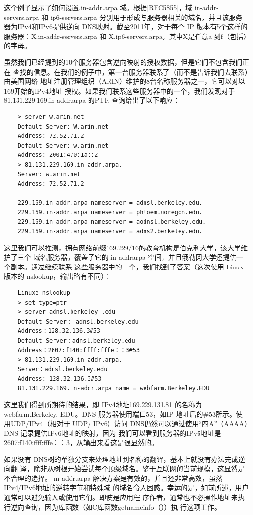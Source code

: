 这个例子显示了如何设置.in-addr.arpa 域。根据\href{https://www.rfc-editor.org/rfc/rfc5855}{[RFC5855]}，域 in-addr-servers.arpa 和
ip6-servers.arpa 分别用于形成与服务器相关的域名，并且该服务器为IPv4和IPv6提供逆向
DNS映射。截至2011年，对于每个 IP 版本有5个这样的服务器：X.in-addr-servers.arpa 和
X.ip6-servers.arpa，其中X是任意a 到f（包括）的字母。

虽然我们已经提到的10个服务器包含逆向映射的授权数据，但是它们不包含我们正在
查找的信息。在我们的例子中，第一台服务器联系了（而不是告诉我们去联系）由美国网络
地址注册管理组织（ARIN）维护的8台名称服务器之一，它可以对以 169开始的IPv4地址
授权。如果我们联系这些服务器中的一个，我们发现对于81.131.229.169.in-addr.arpa 的PTR
查询给出了以下响应：
\begin{verbatim} 
    > server w.arin.net
    Default Server: W.arin.net
    Address: 72.52.71.2
    Default Server: w.arin.net
    Address: 2001:470:1a::2
    > 81.131.229.169.in-addr.arpa.
    Server: w.arin.net
    Address: 72.52.71.2

    229.169.in-addr.arpa nameserver = adnsl.berkeley.edu.
    229.169.in-addr.arpa nameserver = phloem.uoregon.edu.
    229.169.in-addr.arpa nameserver = aodnsl.berkeley.edu.
    229.169.in-addr.arpa nameserver = adns2.berkeley.edu.
\end{verbatim}

这里我们可以推测，拥有网络前缀169.229/16的教育机构是伯克利大学，该大学维护了三个
域名服务器，覆盖了它的 in-addrarpa 空间，并且俄勒冈大学还提供一个副本。通过继续联系
这些服务器中的一个，我们找到了答案（这次使用 Linux版本的 nslookup，输出略有不同）：

\begin{verbatim}
    Linuxe nslookup
    > set type=ptr
    > server adnsl.berkeley .edu
    Default Server： adnsl.berkeley.edu
    Address：128.32.136.3#53
    Default Server：adnsl.berkeley.edu
    Address：2607:f140:ffff:fffe：：3#53
    > 81.131.229.169.in-addr.arpa.
    Server：adnsl.berkeley.edu
    Address: 128.32.136.3#53
    81.131.229.169.in-addr.arpa name = webfarm.Berkeley.EDU
\end{verbatim}

这里我们得到所期待的结果，即 IPv4地址169.229.131.81 的名称为 webfarm.Berkeley.
EDU。DNS 服务器使用端口53，如IP 地址后的\#53所示。使用UDP/IPv4（相对于 UDP/
IPv6）访问 DNS仍然可以通过使用“四A”（AAAA）DNS 记录提供IPv6地址的映射，因为
我们可以看到服务器的IPv6地址是 2607:f140:ffff:fffe：：3，从输出来看这是很显然的。

如果没有 DNS树的单独分支来处理地址到名称的翻译，基本上就没有办法完成逆向翻
译，除非从树根开始尝试每个顶级域名。鉴于互联网的当前规模，这显然是不合理的选择。
in-addr.arpa 解决方案是有效的，并且还非常高效，虽然IPv4/IPv6地址的逆转字节和特殊域
的域名令人困惑。幸运的是，如前所述，用户通常可以避免输人或使用它们。即使是应用程
序作者，通常也不必操作地址来执行逆向查询，因为库函数（如C库函数getnameinfo（））执
行这项工作。

